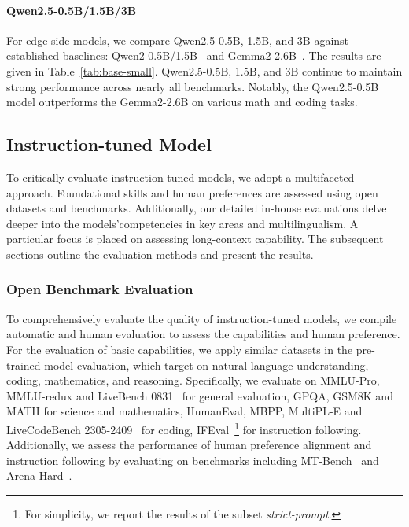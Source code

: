 \paragraph{Qwen2.5-0.5B/1.5B/3B}
For edge-side models, we compare Qwen2.5-0.5B, 1.5B, and 3B against established baselines: Qwen2-0.5B/1.5B~\citep{qwen2} and Gemma2-2.6B~\citep{gemma2}. The results are given in Table~\ref{tab:base-small}. Qwen2.5-0.5B, 1.5B, and 3B continue to maintain strong performance across nearly all benchmarks. Notably, the Qwen2.5-0.5B model outperforms the Gemma2-2.6B on various math and coding tasks.

\subsection{Instruction-tuned Model}

To critically evaluate instruction-tuned models, we adopt a multifaceted approach. 
Foundational skills and human preferences are assessed using open datasets and benchmarks. 
Additionally, our detailed in-house evaluations delve deeper into the models'competencies in key areas and multilingualism. 
A particular focus is placed on assessing long-context capability.
The subsequent sections outline the evaluation methods and present the results.

\subsubsection{Open Benchmark Evaluation}

To comprehensively evaluate the quality of instruction-tuned models, we compile automatic and human evaluation to assess the capabilities and human preference. 
For the evaluation of basic capabilities, we apply similar datasets in the pre-trained model evaluation, which target on natural language understanding, coding, mathematics, and reasoning. 
Specifically, we evaluate on MMLU-Pro, MMLU-redux and LiveBench 0831~\citep{livebench} for general evaluation, GPQA, GSM8K and MATH for science and mathematics, HumanEval, MBPP, MultiPL-E and LiveCodeBench 2305-2409~\citep{livecodebench} for coding, 
IFEval~\citep{ifeval}\footnote{For simplicity, we report the results of the subset \textit{strict-prompt}.} for instruction following.
Additionally, we assess the performance of human preference alignment and instruction following by evaluating on benchmarks including MT-Bench~\citep{mtbench} and Arena-Hard~\citep{arena-hard}.



